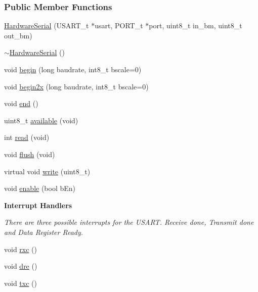 \subsubsection*{Public Member Functions}
\begin{DoxyCompactItemize}
\item 
\hyperlink{class_hardware_serial_ab96331f0886097eb802a7839676ef645}{HardwareSerial} (USART\_\-t $\ast$usart, PORT\_\-t $\ast$port, uint8\_\-t in\_\-bm, uint8\_\-t out\_\-bm)
\item 
\hyperlink{class_hardware_serial_a1c7aae049aba33b03fe030960c1c4aa7}{$\sim$HardwareSerial} ()
\item 
void \hyperlink{class_hardware_serial_a11049d350f4cf4bfdaafb24bb2738556}{begin} (long baudrate, int8\_\-t bscale=0)
\item 
void \hyperlink{class_hardware_serial_adcfab60db442174cb53f005df6d2996d}{begin2x} (long baudrate, int8\_\-t bscale=0)
\item 
void \hyperlink{class_hardware_serial_a0f86c41f580e04bdf30ea00e9014eacd}{end} ()
\item 
uint8\_\-t \hyperlink{class_hardware_serial_a10e05fa62dc473d0d8a7ee8184f504ba}{available} (void)
\item 
int \hyperlink{class_hardware_serial_a618696608a5fddcf3cb48ad6f044e756}{read} (void)
\item 
void \hyperlink{class_hardware_serial_a1eeb094d8da77e0292f95f4498a5396f}{flush} (void)
\item 
virtual void \hyperlink{class_hardware_serial_aced05ab99953383a235ccfb366f5c98f}{write} (uint8\_\-t)
\item 
void \hyperlink{class_hardware_serial_a2e13244413a84a259cadab3fb452921a}{enable} (bool bEn)
\end{DoxyCompactItemize}
\begin{Indent}{\bf Interrupt Handlers}\par
{\em There are three possible interrupts for the USART. Receive done, Transmit done and Data Register Ready. }\begin{DoxyCompactItemize}
\item 
void \hyperlink{class_hardware_serial_ac52002a727070c45b765d0dc55106cad}{rxc} ()
\item 
void \hyperlink{class_hardware_serial_ac33af9a86da3e3ae7ac1e2791c8eaf22}{dre} ()
\item 
void \hyperlink{class_hardware_serial_a82779b03507bc07f3bf2e090d3733015}{txc} ()
\end{DoxyCompactItemize}
\end{Indent}
